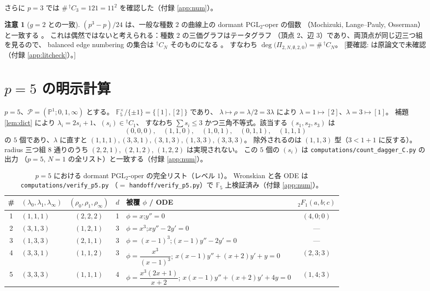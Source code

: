 \documentclass[a4paper,11pt]{ltjsarticle}
\theoremstyle{plain}
\theoremstyle{definition}
\newtheorem{remark}[theorem]{注意}
\newcommand{\NeedsCheck}[1]{\textcolor{blue!70!black}{\textsf{[要確認: #1]}}}
\newcommand{\bbP}{\mathbb{P}}
\newcommand{\bbF}{\mathbb{F}}
\newcommand{\sP}{\mathscr{P}}
\begin{document}
さらに $p=3$ では $\#\,{}^{\dagger}C_3=121=11^2$ を確認した（付録 \ref{app:num}）。

\begin{remark}[$g=2$ との一致]\label{rem:genus2}
$(p^3-p)/24$ は、一般な種数 $2$ の曲線上の dormant $\mathrm{PGL}_2$-oper の個数
（Mochizuki, Lange--Pauly, Osserman）と一致する \cite[(1.2)]{Wak2}。
これは偶然ではないと考えられる：種数 $2$ の三価グラフはテータグラフ
（頂点 $2$、辺 $3$）であり、両頂点が同じ辺三つ組を見るので、
balanced edge numbering の集合は ${}^{\dagger}C_N$ そのものになる \cite[Thm.~E]{Wak2}。
すなわち $\deg\bigl(\Pi_{2,N,\emptyset,2,0}\bigr)=\#\,{}^{\dagger}C_N$。
\NeedsCheck{\cite[Thm.~E, (1.2)]{Wak2} は原論文で未確認（付録 \ref{app:litcheck}）。}
\end{remark}

\section{$p=5$ の明示計算}\label{sec:p5}

$p=5$、$\sP=(\bbP^1;0,1,\infty)$ とする。
$\bbF_5^\times/\{\pm1\}=\{[1],[2]\}$ であり、
$\lambda\mapsto\rho=\lambda/2=3\lambda$ により
$\lambda=1\mapsto[2]$、$\lambda=3\mapsto[1]$。
補題 \ref{lem:dict} により $\lambda_i=2s_i+1$、$(s_i)\in{}^{\dagger}C_1$、
すなわち $\sum s_i\le3$ かつ三角不等式。該当する $(s_1,s_2,s_3)$ は
\[
  (0,0,0),\quad(1,1,0),\quad(1,0,1),\quad(0,1,1),\quad(1,1,1)
\]
の $5$ 個であり、$\lambda$ に直すと
$(1,1,1),(3,3,1),(3,1,3),(1,3,3),(3,3,3)$。
除外されるのは $(1,1,3)$ 型（$3<1+1$ に反する）。
radius 三つ組 $8$ 通りのうち $(2,2,1)$, $(2,1,2)$, $(1,2,2)$ は実現されない。
この $5$ 個の $(s_i)$ は \texttt{computations/count\_dagger\_C.py} の出力
（$p=5$, $N=1$ の全リスト）と一致する（付録 \ref{app:num}）。

\begin{table}[htbp]
\centering
\caption{$p=5$ における dormant $\mathrm{PGL}_2$-oper の完全リスト（レベル $1$）。
Wronskian と各 ODE は \texttt{computations/verify\_p5.py}
（$=$ \texttt{handoff/verify\_p5.py}）で $\bbF_5$ 上検証済み（付録 \ref{app:num}）。}
\label{tab:p5}
\small
\begin{tabular}{clcclc}
\toprule
\# & $(\lambda_0,\lambda_1,\lambda_\infty)$ & $(\rho_0,\rho_1,\rho_\infty)$ & $d$
   & 被覆 $\phi$ / ODE & ${}_2F_1(a,b;c)$\\
\midrule
1 & $(1,1,1)$ & $(2,2,2)$ & 1 & $\phi=x$;\quad $y''=0$ & $(4,0;0)$\\[2pt]
2 & $(3,1,3)$ & $(1,2,1)$ & 3 & $\phi=x^3$;\quad $xy''-2y'=0$ & ---\\[2pt]
3 & $(1,3,3)$ & $(2,1,1)$ & 3 & $\phi=(x-1)^3$;\quad $(x-1)y''-2y'=0$ & ---\\[2pt]
4 & $(3,3,1)$ & $(1,1,2)$ & 3 & $\phi=\dfrac{x^3}{(x-1)^3}$;\quad
      $x(x-1)y''+(x+2)y'+y=0$ & $(2,3;3)$\\[8pt]
5 & $(3,3,3)$ & $(1,1,1)$ & 4 & $\phi=\dfrac{x^3(2x+1)}{x+2}$;\quad
      $x(x-1)y''+(x+2)y'+4y=0$ & $(1,4;3)$\\
\bottomrule
\end{tabular}
\end{table}
\end{document}
